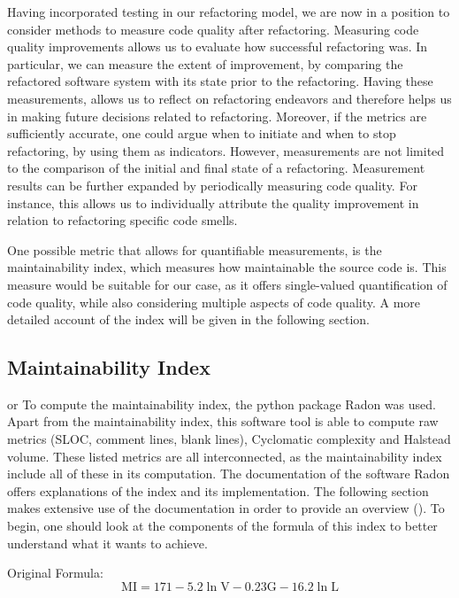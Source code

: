 Having incorporated testing in our refactoring model, we are now in a position to consider methods to measure code quality after refactoring. Measuring code quality improvements allows us to evaluate how successful refactoring was. In particular, we can measure the extent of improvement, by comparing the refactored software system with its state prior to the refactoring. Having these measurements, allows us to reflect on refactoring endeavors and therefore helps us in making future decisions related to refactoring. Moreover, if the metrics are sufficiently accurate, one could argue when to initiate and when to stop refactoring, by using them as indicators. However, measurements are not limited to the comparison of the initial and final state of a refactoring. Measurement results can be further expanded by periodically measuring code quality. For instance, this allows us to individually attribute the quality improvement in relation to refactoring specific code smells. 

One possible metric that allows for quantifiable measurements, is the maintainability index, which measures how maintainable the source code is. This measure would be suitable for our case, as it offers single-valued quantification of code quality, while also considering multiple aspects of code quality. A more detailed account of the index will be given in the following section.

\subsection{Maintainability Index}
or
To compute the maintainability index, the python package Radon was used. Apart from the maintainability index, this software tool is able to compute raw metrics (SLOC, comment lines, blank lines), Cyclomatic complexity and Halstead volume. These listed metrics are all interconnected, as the maintainability index include all of these in its computation. The documentation of the software Radon offers explanations of the index and its implementation. The following section makes extensive use of the documentation in order to provide an overview (\cite{zotero-undefinedc}). To begin, one should look at the components of the formula of this index to better understand what it wants to achieve.  


Original Formula:
\begin{equation}
\label{eq:original}
\mathrm{MI}=171-5.2 \ln \mathrm{V}-0.23 \mathrm{G}-16.2 \ln \mathrm{L}
\end{equation}

